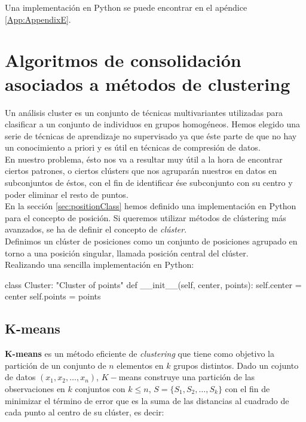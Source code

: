 \documentclass[a4paper, 12pt]{article}
\begin{document}
Una implementaci\'on en Python se puede encontrar en el ap\'endice \ref{App:AppendixE}.\\


\pagebreak
\section{Algoritmos de consolidaci\'on asociados a m\'etodos de clustering}

Un an\'alisis cluster es un conjunto de t\'ecnicas multivariantes utilizadas para clasificar a un conjunto de individuos en grupos homog\'eneos. Hemos elegido una serie de t\'ecnicas de aprendizaje no supervisado ya que \'este parte de que no hay un conocimiento a priori y es \'util en t\'ecnicas de compresi\'on de datos.\\

En nuestro problema, \'esto nos va a resultar muy \'util a la hora de encontrar ciertos patrones, o ciertos cl\'usters que nos agrupar\'an nuestros en datos en subconjuntos de \'estos, con el fin de identificar \'ese subconjunto con su centro y poder eliminar el resto de puntos. \\

En la secci\'on \ref{sec:positionClass} hemos definido una implementaci\'on en Python para el concepto de posici\'on. Si queremos utilizar m\'etodos de cl\'ustering m\'as avanzados, se ha de definir el concepto de \textit{cl\'uster}. \\

Definimos un cl\'uster de posiciones como un conjunto de posiciones agrupado en torno a una posici\'on singular, llamada posici\'on central del cl\'uster.\\

Realizando una sencilla implementaci\'on en Python:\\

\begin{python}
class Cluster:
	"Cluster of points"
	def __init__(self, center, points):
		self.center = center
		self.points = points
\end{python}


\subsection{K-means}

\textbf{K-means}\cite{importantPlaces} es un m\'etodo eficiente de \textit{clustering} que tiene como objetivo la partici\'on de un conjunto de $n$ elementos en $k$ grupos distintos. Dado un cojunto de datos $(x_1, x_2, \ldots , x_n)$, $K-$means construye una partici\'on de las observaciones en $k$ conjuntos con $k\leq n$, $S=\{S_1, S_2, \ldots, S_k\}$ con el fin de minimizar el t\'ermino de error que es la suma de las distancias al cuadrado de cada punto al centro de su cl\'uster, es decir:
\end{document}
